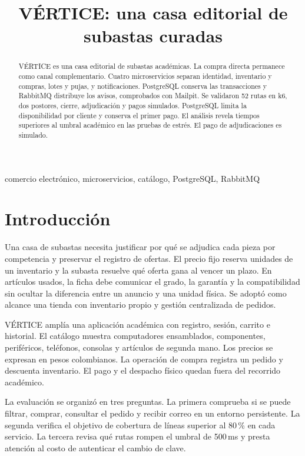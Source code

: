 \documentclass[conference]{IEEEtran}
\title{VÉRTICE: una casa editorial de subastas curadas}
\author{\IEEEauthorblockN{Equipo del proyecto ECOMMERCE\_FRANK}}
\begin{document}
\maketitle
\begin{abstract}
VÉRTICE es una casa editorial de subastas académicas. La compra directa permanece como canal complementario. Cuatro microservicios separan identidad, inventario y compras, lotes y pujas, y notificaciones. PostgreSQL conserva las transacciones y RabbitMQ distribuye los avisos, comprobados con Mailpit. Se validaron 52 rutas en k6, dos postores, cierre, adjudicación y pagos simulados. PostgreSQL limita la disponibilidad por cliente y conserva el primer pago. El análisis revela tiempos superiores al umbral académico en las pruebas de estrés. El pago de adjudicaciones es simulado.
\end{abstract}
\begin{IEEEkeywords}
comercio electrónico, microservicios, catálogo, PostgreSQL, RabbitMQ
\end{IEEEkeywords}

\section{Introducción}
Una casa de subastas necesita justificar por qué se adjudica cada pieza por competencia y preservar el registro de ofertas. El precio fijo reserva unidades de un inventario y la subasta resuelve qué oferta gana al vencer un plazo. En artículos usados, la ficha debe comunicar el grado, la garantía y la compatibilidad sin ocultar la diferencia entre un anuncio y una unidad física. Se adoptó como alcance una tienda con inventario propio y gestión centralizada de pedidos.

VÉRTICE amplía una aplicación académica con registro, sesión, carrito e historial. El catálogo muestra computadores ensamblados, componentes, periféricos, teléfonos, consolas y artículos de segunda mano. Los precios se expresan en pesos colombianos. La operación de compra registra un pedido y descuenta inventario. El pago y el despacho físico quedan fuera del recorrido académico.

La evaluación se organizó en tres preguntas. La primera comprueba si se puede filtrar, comprar, consultar el pedido y recibir correo en un entorno persistente. La segunda verifica el objetivo de cobertura de líneas superior al 80\,\% en cada servicio. La tercera revisa qué rutas rompen el umbral de 500\,ms y presta atención al costo de autenticar el cambio de clave.
\end{document}
